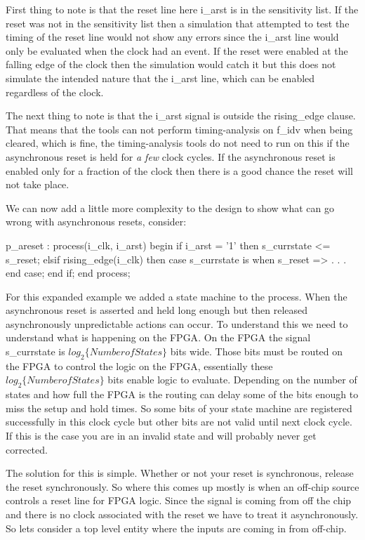 First thing to note is that the reset line here i\_arst is in the sensitivity list. If the reset was not in the sensitivity list then a simulation that attempted to test the timing of the reset line would not show any errors since the i\_arst line would only be evaluated when the clock had an event. If the reset were enabled at the falling edge of the clock then the simulation would catch it but this does not simulate the intended nature that the i\_arst line, which can be enabled regardless of the clock. 

The next thing to note is that the i\_arst signal is outside the rising\_edge clause. That means that the tools can not perform timing-analysis on f\_idv when being cleared, which is fine, the timing-analysis tools do not need to run on this if the asynchronous reset is held for \emph{a few} clock cycles. If the asynchronous reset is enabled only for a fraction of the clock then there is a good chance the reset will not take place. 

We can now add a little more complexity to the design to show what can go wrong with asynchronous resets, consider:

\begin{VHDLlisting}[tabsize=4]
p_areset : process(i_clk, i_arst)
begin
	if i_arst = '1' then
		s_currstate <= s_reset;
	elsif rising_edge(i_clk) then
		case s_currstate is
			when s_reset => 
			.
			.
			.
		end case;
	end if;
end process;
\end{VHDLlisting}

For this expanded example we added a state machine to the process. When the asynchronous reset is asserted and held long enough but then released asynchronously unpredictable actions can occur. To understand this we need to understand what is happening on the \ac{FPGA}. On the \ac{FPGA} the signal s\_currstate is $log_2\{Number of States\}$ bits wide. Those bits must be routed on the \ac{FPGA} to control the logic on the \ac{FPGA}, essentially these $log_2\{Number of States\}$ bits enable logic to evaluate. Depending on the number of states and how full the \ac{FPGA} is the routing can delay some of the bits enough to miss the setup and hold times. So some bits of your state machine are registered successfully in this clock cycle but other bits are not valid until next clock cycle. If this is the case you are in an invalid state and will probably never get corrected. 

The solution for this is simple. Whether or not your reset is synchronous, release the reset synchronously. So where this comes up mostly is when an off-chip source controls a reset line for \ac{FPGA} logic. Since the signal is coming from off the chip and there is no clock associated with the reset we have to treat it asynchronously. So lets consider a top level entity where the inputs are coming in from off-chip. 

